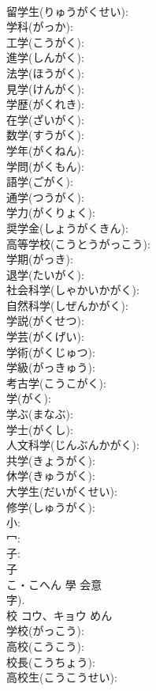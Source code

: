 \documentclass[8pt]{extreport}
\begin{document}
\begin{CJK}{UTF8}{min}
\\	留学生(りゅうがくせい): 
\\	学科(がっか): 
\\	工学(こうがく): 
\\	進学(しんがく): 
\\	法学(ほうがく): 
\\	見学(けんがく): 
\\	学歴(がくれき): 
\\	在学(ざいがく): 
\\	数学(すうがく): 
\\	学年(がくねん): 
\\	学問(がくもん): 
\\	語学(ごがく): 
\\	通学(つうがく): 
\\	学力(がくりょく): 
\\	奨学金(しょうがくきん): 
\\	高等学校(こうとうがっこう): 
\\	学期(がっき): 
\\	退学(たいがく): 
\\	社会科学(しゃかいかがく): 
\\	自然科学(しぜんかがく): 
\\	学説(がくせつ): 
\\	学芸(がくげい): 
\\	学術(がくじゅつ): 
\\	学級(がっきゅう): 
\\	考古学(こうこがく): 
\\	学(がく): 
\\	学ぶ(まなぶ): 
\\	学士(がくし): 
\\	人文科学(じんぶんかがく): 
\\	共学(きょうがく): 
\\	休学(きゅうがく): 
\\	大学生(だいがくせい): 
\\	修学(しゅうがく): 
\\	小: 
\\	冖: 
\\	子: 
\\	子	
\\	こ・こへん	學	会意 
\\	字).	
\\	校	コウ、キョウ		めん	
\\	学校(がっこう): 
\\	高校(こうこう): 
\\	校長(こうちょう): 
\\	高校生(こうこうせい): 

\end{CJK}
\end{document}
